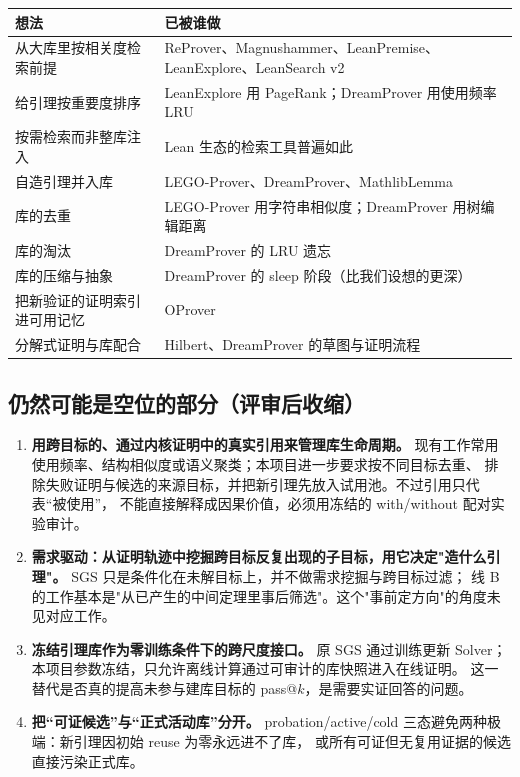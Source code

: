 \documentclass[UTF8,a4paper,11pt,fontset=windows]{ctexart}
\begin{document}
\begin{table}[htbp]
\centering
\small
\begin{tabularx}{\textwidth}{@{}p{6.2cm}Y@{}}
\toprule
\textbf{想法} & \textbf{已被谁做} \\
\midrule
从大库里按相关度检索前提 & ReProver、Magnushammer、LeanPremise、LeanExplore、LeanSearch v2 \\
\midrule
给引理按重要度排序 & LeanExplore 用 PageRank；DreamProver 用使用频率 LRU \\
\midrule
按需检索而非整库注入 & Lean 生态的检索工具普遍如此 \\
\midrule
自造引理并入库 & LEGO-Prover、DreamProver、MathlibLemma \\
\midrule
库的去重 & LEGO-Prover 用字符串相似度；DreamProver 用树编辑距离 \\
\midrule
库的淘汰 & DreamProver 的 LRU 遗忘 \\
\midrule
库的压缩与抽象 & DreamProver 的 sleep 阶段（比我们设想的更深） \\
\midrule
把新验证的证明索引进可用记忆 & OProver \\
\midrule
分解式证明与库配合 & Hilbert、DreamProver 的草图与证明流程 \\
\bottomrule
\end{tabularx}
\end{table}

\subsection{仍然可能是空位的部分（评审后收缩）}

\begin{enumerate}[leftmargin=1.6em,itemsep=3pt]
  \item \textbf{用跨目标的、通过内核证明中的真实引用来管理库生命周期。}
        现有工作常用使用频率、结构相似度或语义聚类；本项目进一步要求按不同目标去重、
        排除失败证明与候选的来源目标，并把新引理先放入试用池。不过引用只代表“被使用”，
        不能直接解释成因果价值，必须用冻结的 with/without 配对实验审计。
  \item \textbf{需求驱动：从证明轨迹中挖掘跨目标反复出现的子目标，用它决定"造什么引理"。}
        SGS 只是条件化在未解目标上，并不做需求挖掘与跨目标过滤；
        线 B 的工作基本是"从已产生的中间定理里事后筛选"。这个"事前定方向"的角度未见对应工作。
  \item \textbf{冻结引理库作为零训练条件下的跨尺度接口。}
        原 SGS 通过训练更新 Solver；本项目参数冻结，只允许离线计算通过可审计的库快照进入在线证明。
        这一替代是否真的提高未参与建库目标的 pass@$k$，是需要实证回答的问题。
  \item \textbf{把“可证候选”与“正式活动库”分开。}
        probation/active/cold 三态避免两种极端：新引理因初始 reuse 为零永远进不了库，
        或所有可证但无复用证据的候选直接污染正式库。
\end{enumerate}
\end{document}
